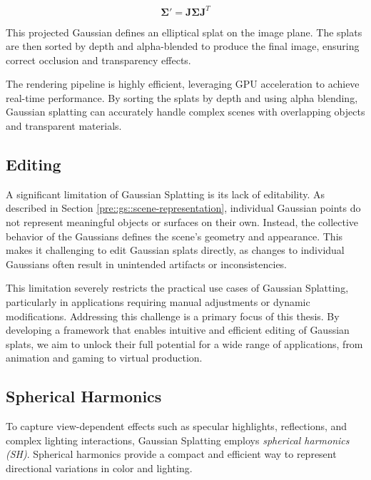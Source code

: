 \[
\boldsymbol{\Sigma}' = \mathbf{J}\boldsymbol{\Sigma}\mathbf{J}^T
\label{eq:projection}
\]

This projected Gaussian defines an elliptical splat on the image plane. The splats are then sorted by depth and alpha-blended to produce the final image, ensuring correct occlusion and transparency effects.

The rendering pipeline is highly efficient, leveraging GPU acceleration to achieve real-time performance. By sorting the splats by depth and using alpha blending, Gaussian splatting can accurately handle complex scenes with overlapping objects and transparent materials.







\subsection{Editing}

\label{pre::gs::editing}

A significant limitation of Gaussian Splatting is its lack of editability. As described in Section \ref{pre::gs::scene-representation}, individual Gaussian points do not represent meaningful objects or surfaces on their own. Instead, the collective behavior of the Gaussians defines the scene's geometry and appearance. This makes it challenging to edit Gaussian splats directly, as changes to individual Gaussians often result in unintended artifacts or inconsistencies.

This limitation severely restricts the practical use cases of Gaussian Splatting, particularly in applications requiring manual adjustments or dynamic modifications. Addressing this challenge is a primary focus of this thesis. By developing a framework that enables intuitive and efficient editing of Gaussian splats, we aim to unlock their full potential for a wide range of applications, from animation and gaming to virtual production.









\subsection{Spherical Harmonics}
\label{pre::gs::spherical-harmonics}

To capture view-dependent effects such as specular highlights, reflections, and complex lighting interactions, Gaussian Splatting employs \textit{spherical harmonics (SH)}. Spherical harmonics provide a compact and efficient way to represent directional variations in color and lighting.

